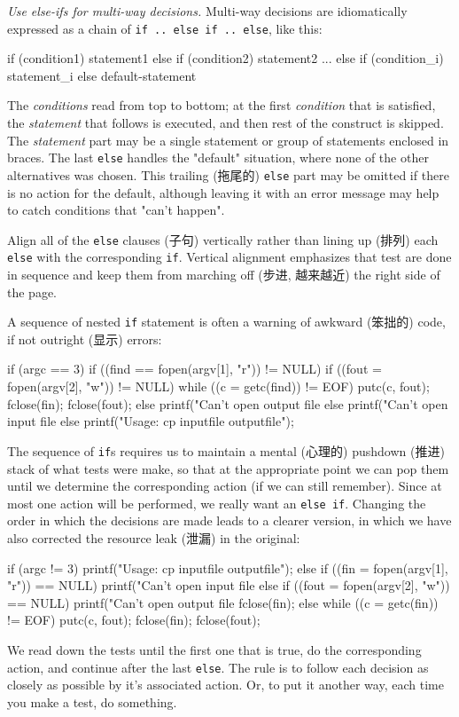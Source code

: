 \emph{Use else-ifs for multi-way decisions.} Multi-way decisions are
idiomatically expressed as a chain of \verb'if .. else if .. else', like this:
\begin{wellcode}
    if (condition1)
        statement1
    else if (condition2)
        statement2
    ...
    else if (condition_i)
        statement_i
    else 
        default-statement
\end{wellcode}
The \textit{conditions} read from top to bottom; at the first
\textit{condition} that is satisfied, the \textit{statement} that follows
is executed, and then rest of the construct is skipped. The
\textit{statement} part may be a single statement or group of statements
enclosed in braces. The last \verb'else' handles the "default" situation,
where none of the other alternatives was chosen. This trailing (拖尾的)
\verb'else' part may be omitted if there is no action for the default,
although leaving it with an error message may help to catch conditions that
"can't happen".

Align all of the \verb'else' clauses (子句) vertically rather than lining
up (排列) each \verb'else' with the corresponding \verb'if'. Vertical
alignment emphasizes that test are done in sequence and keep them from
marching off (步进, 越来越近) the right side of the page.

A sequence of nested \verb'if' statement is often a warning of
awkward (笨拙的) code, if not outright (显示) errors:
\begin{badcode}
    if (argc == 3)
        if ((find == fopen(argv[1], "r")) != NULL)
            if ((fout = fopen(argv[2], "w")) != NULL) {
                while ((c = getc(find)) != EOF)
                    putc(c, fout);
                fclose(fin); fclose(fout);
            } else 
                printf("Can't open output file %
        else 
            printf("Can't open input file %
    else 
        printf("Usage: cp inputfile outputfile\n");
\end{badcode}
The sequence of \verb'if's requires us to maintain a mental (心理的)
pushdown (推进) stack of what tests were make, so that at the appropriate
point we can pop them until we determine the corresponding action (if we
can still remember). Since at most one action will be performed, we really
want an \verb'else if'. Changing the order in which the decisions are made
leads to a clearer version, in which we have also corrected the resource
leak (泄漏) in the original:
\begin{wellcode}
    if (argc != 3)
        printf("Usage: cp inputfile outputfile\n");
    else if ((fin = fopen(argv[1], "r")) == NULL)
        printf("Can't open input file %
    else if ((fout = fopen(argv[2], "w")) == NULL) {
        printf("Can't open output file %
        fclose(fin);
    } else {
        while ((c = getc(fin)) != EOF)
            putc(c, fout);
        fclose(fin);
        fclose(fout);
    }
\end{wellcode}
We read down the tests until the first one that is true, do the
corresponding action, and continue after the last \verb'else'. The rule is
to follow each decision as closely as possible by it's associated action.
Or, to put it another way, each time you make a test, do something.


